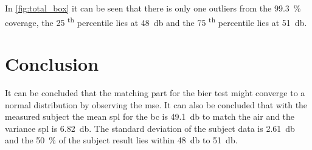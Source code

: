 In \autoref{fig:total_box} it can be seen that there is only one outliers from the \SI{99.3}{\percent} coverage, the 25 \textsuperscript{th} percentile lies at \SI{48}{\decibel} and the 75 \textsuperscript{th} percentile lies at \SI{51}{\decibel}.


\section{Conclusion}
It can be concluded that the matching part for the \gls{bier} test might converge to a normal distribution by observing the \gls{mse}. It can also be concluded that with the measured subject the mean \gls{spl} for the \gls{bc} is \SI{49.1}{\decibel} to match the air  and the variance \gls{spl} is \SI{6.82}{\decibel}. The standard deviation of the subject data is \SI{2.61}{\decibel} and the \SI{50}{\percent} of the subject result lies within \SI{48}{\decibel} to \SI{51}{\decibel}.





